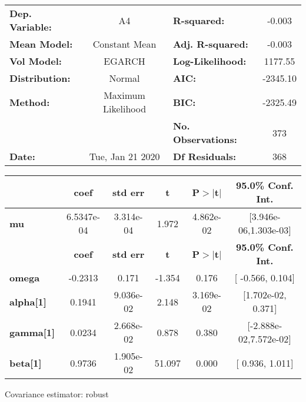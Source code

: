 \begin{center}
\begin{tabular}{lclc}
\toprule
\textbf{Dep. Variable:} &         A4         & \textbf{  R-squared:         } &    -0.003   \\
\textbf{Mean Model:}    &   Constant Mean    & \textbf{  Adj. R-squared:    } &    -0.003   \\
\textbf{Vol Model:}     &       EGARCH       & \textbf{  Log-Likelihood:    } &    1177.55  \\
\textbf{Distribution:}  &       Normal       & \textbf{  AIC:               } &   -2345.10  \\
\textbf{Method:}        & Maximum Likelihood & \textbf{  BIC:               } &   -2325.49  \\
\textbf{}               &                    & \textbf{  No. Observations:  } &    373      \\
\textbf{Date:}          &  Tue, Jan 21 2020  & \textbf{  Df Residuals:      } &    368      \\
\bottomrule
\end{tabular}
\begin{tabular}{lccccc}
            & \textbf{coef} & \textbf{std err} & \textbf{t} & \textbf{P$>$$|$t$|$} & \textbf{95.0\% Conf. Int.}  \\
\midrule
\textbf{mu} &   6.5347e-04  &    3.314e-04     &     1.972  &      4.862e-02       &   [3.946e-06,1.303e-03]     \\
                  & \textbf{coef} & \textbf{std err} & \textbf{t} & \textbf{P$>$$|$t$|$} & \textbf{95.0\% Conf. Int.}  \\
\midrule
\textbf{omega}    &      -0.2313  &        0.171     &    -1.354  &          0.176       &     [ -0.566,  0.104]       \\
\textbf{alpha[1]} &       0.1941  &    9.036e-02     &     2.148  &      3.169e-02       &    [1.702e-02,  0.371]      \\
\textbf{gamma[1]} &       0.0234  &    2.668e-02     &     0.878  &          0.380       &   [-2.888e-02,7.572e-02]    \\
\textbf{beta[1]}  &       0.9736  &    1.905e-02     &    51.097  &        0.000         &     [  0.936,  1.011]       \\
\bottomrule
\end{tabular}
\end{center}

Covariance estimator: robust